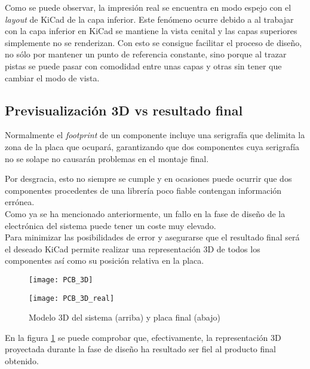 Como se puede observar, la impresión real se encuentra en modo espejo con el \textit{layout} de KiCad de la capa inferior. Este fenómeno ocurre debido a  al trabajar con la capa inferior en KiCad se mantiene la vista cenital y las capas superiores simplemente no se renderizan. Con esto se consigue facilitar el proceso de diseño, no sólo por mantener un punto de referencia constante, sino porque al trazar pistas se puede pasar con comodidad entre unas capas y otras sin tener que cambiar el modo de vista.

\subsection{Previsualización 3D vs resultado final\label{sec:Modelo_3D}}

Normalmente el \textit{footprint} de un componente incluye una serigrafía que delimita la zona de la placa que ocupará, garantizando que dos componentes cuya serigrafía no se solape no causarán problemas en el montaje final.

Por desgracia, esto no siempre se cumple y en ocasiones puede ocurrir que dos componentes procedentes de una librería poco fiable contengan información errónea. 
\\Como ya se ha mencionado anteriormente, un fallo en la fase de diseño de la electrónica del sistema puede tener un coste muy elevado. \\Para minimizar las posibilidades de error y asegurarse que el resultado final será el deseado KiCad permite realizar una representación 3D de todos los componentes así como su posición relativa en la placa.


\begin{figure} [h]
    \centering
    \texttt{[image: PCB\_3D]}

    \texttt{[image: PCB\_3D\_real]}
    \caption{Modelo 3D del sistema (arriba) y placa final (abajo)}
    \label{fig:Comparativa_PCB_final}
\end{figure}

En la figura \ref{fig:Comparativa_PCB_final} se puede comprobar que, efectivamente, la representación 3D proyectada  durante la fase de diseño ha resultado ser fiel al producto final obtenido.
